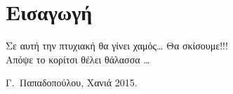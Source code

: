 \chapter*{Εισαγωγή}

Σε αυτή την πτυχιακή θα γίνει χαμός\ldots
Θα σκίσουμε!!!\\ Απόψε το κορίτσι θέλει θάλασσα \ldots




\bigskip

\begin{flushright}
\begin{minipage}{150pt}
Γ.\ Παπαδοπούλου, Χανιά 2015.
\end{minipage}
\end{flushright}



\endinput
